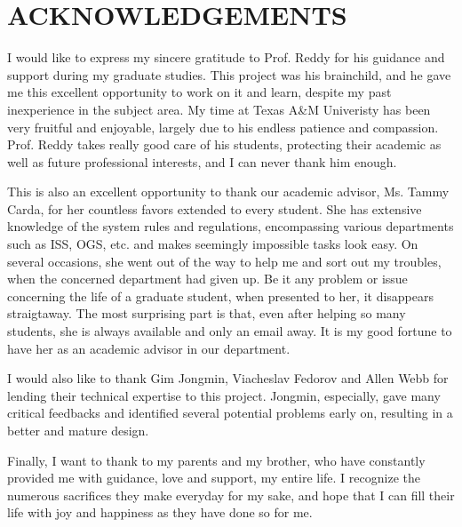%
%
%


\chapter*{ACKNOWLEDGEMENTS}


\indent 

I would like to express my sincere gratitude to Prof. Reddy for his guidance and support during my graduate studies. 
This project was his brainchild, and he gave me this excellent opportunity to work on it and learn, despite my past inexperience in the subject area. 
My time at Texas A\&M Univeristy has been very fruitful and enjoyable, largely due to his endless patience and compassion.
Prof. Reddy takes really good care of his students, protecting their academic as well as future professional interests, and I can never thank him enough. 

This is also an excellent opportunity to thank our academic advisor, Ms. Tammy Carda, for her countless favors extended to every student.
She has extensive knowledge of the system rules and regulations, encompassing various departments such as ISS, OGS, etc. and makes seemingly impossible tasks look easy.
On several occasions, she went out of the way to help me and sort out my troubles, when the concerned department had given up.
Be it any problem or issue concerning the life of a graduate student, when presented to her, it disappears straigtaway.
The most surprising part is that, even after helping so many students, she is always available and only an email away.
It is my good fortune to have her as an academic advisor in our department.

I would also like to thank Gim Jongmin, Viacheslav Fedorov and Allen Webb for lending their technical expertise to this project. Jongmin, especially, gave many critical feedbacks and identified several potential problems early on, resulting in a better and mature design. 

Finally, I want to thank to my parents and my brother, who have constantly provided me with guidance, love and support, my entire life. I recognize the numerous sacrifices they make everyday for my sake, and hope that I can fill their life with joy and happiness as they have done so for me.

\pagebreak{}
